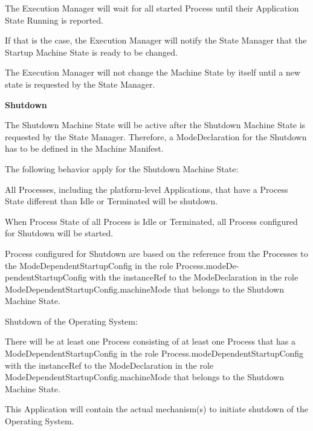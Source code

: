 \begin{DoxyItemize}
\begin{DoxyItemize}
\begin{DoxyItemize}
\item The Execution Manager will wait for all started Process until their Application State Running is reported.
\item If that is the case, the Execution Manager will notify the State Manager that the Startup Machine State is ready to be changed.
\item The Execution Manager will not change the Machine State by itself until a new state is requested by the State Manager.
\end{DoxyItemize}
\end{DoxyItemize}
\item {\bfseries Shutdown}
\begin{DoxyItemize}
\item The Shutdown Machine State will be active after the Shutdown Machine State is requested by the State Manager. Therefore, a Mode\+Declaration for the Shutdown has to be defined in the Machine Manifest.
\item The following behavior apply for the Shutdown Machine State\+:
\begin{DoxyItemize}
\item All Processes, including the platform-\/level Applications, that have a Process State different than Idle or Terminated will be shutdown.
\item When Process State of all Process is Idle or Terminated, all Process configured for Shutdown will be started.
\item Process configured for Shutdown are based on the reference from the Processes to the Mode\+Dependent\+Startup\+Config in the role Process.\+mode\+De-\/pendent\+Startup\+Config with the instance\+Ref to the Mode\+Declaration in the role Mode\+Dependent\+Startup\+Config.\+machine\+Mode that belongs to the Shutdown Machine State.
\end{DoxyItemize}
\item Shutdown of the Operating System\+:
\begin{DoxyItemize}
\item There will be at least one Process consisting of at least one Process that has a Mode\+Dependent\+Startup\+Config in the role Process.\+mode\+Dependent\+Startup\+Config with the instance\+Ref to the Mode\+Declaration in the role Mode\+Dependent\+Startup\+Config.\+machine\+Mode that belongs to the Shutdown Machine State.
\item This Application will contain the actual mechanism(s) to initiate shutdown of the Operating System.
\end{DoxyItemize}

\end{DoxyItemize}
\end{DoxyItemize}
